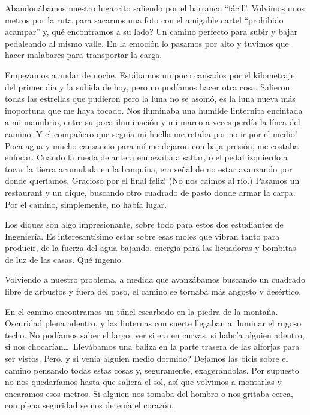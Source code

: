 Abandon\'abamos nuestro lugarcito saliendo por el barranco ``f\'acil''.
Volvimos unos metros por la ruta para sacarnos una foto con el amigable cartel
``prohibido acampar'' y, \textquestiondown qu\'e encontramos a su lado? Un
camino perfecto para subir y bajar pedaleando al mismo valle. En la emoci\'on lo
pasamos por alto y tuvimos que hacer malabares para transportar la carga.

Empezamos a andar de noche. Est\'abamos un poco cansados por el kilometraje del
primer d\'ia y la subida de hoy, pero no pod\'iamos hacer otra cosa. Salieron
todas las estrellas que pudieron pero la luna no se asom\'o, es la luna nueva
m\'as inoportuna que me haya tocado. Nos iluminaba una humilde linternita
encintada a mi manubrio, entre su poca iluminaci\'on y mi mareo a veces perd\'ia
la l\'inea del camino. \textexclamdown Y el compa\~nero que segu\'ia mi huella
me retaba por no ir por el medio! Poca agua y mucho cansancio para m\'i me
dejaron con baja presi\'on, me costaba enfocar. Cuando la rueda delantera
empezaba a saltar, o el pedal izquierdo a tocar la tierra acumulada en la
banquina, era se\~nal de no estar avanzando por donde quer\'iamos.
\textexclamdown Gracioso por el final feliz! (No nos ca\'imos al r\'io.) Pasamos
un restaurant y un dique, buscando otro cuadrado de pasto donde armar la carpa.
Por el camino, simplemente, no hab\'ia lugar.

Los diques son algo impresionante, sobre todo para estos dos estudiantes de
Ingenier\'ia. Es interesant\'isimo estar sobre esas moles que vibran tanto para
producir, de la fuerza del agua bajando, energ\'ia para las licuadoras y
bombitas de luz de las casas. Qu\'e ingenio.

Volviendo a nuestro problema, a medida que avanz\'abamos buscando un cuadrado
libre de arbustos y fuera del paso, el camino se tornaba m\'as angosto y
des\'ertico.

En el camino encontramos un t\'unel escarbado en la piedra de la monta\~na.
Oscuridad plena adentro, y las linternas con suerte llegaban a iluminar el
rugoso techo. No pod\'iamos saber el largo, ver si era en curvas, si habr\'ia
alguien adentro, si nos chocar\'ian\ldots\ Llev\'abamos una baliza en la parte
trasera de las alforjas para ser vistos. Pero, \textquestiondown y si ven\'ia
alguien medio dormido? Dejamos las bicis sobre el camino pensando todas estas
cosas y, seguramente, exager\'andolas. Por supuesto no nos quedar\'iamos hasta
que saliera el sol, as\'i que volvimos a montarlas y encaramos esos metros. Si
alguien nos tomaba del hombro o nos gritaba cerca, con plena seguridad se nos
deten\'ia el coraz\'on.

